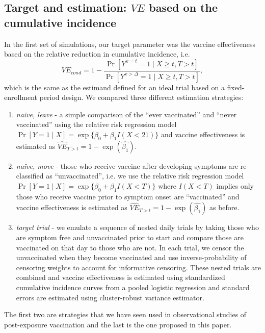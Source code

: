 \begin{appendices}
\begin{refsection}
    \subsection{Target and estimation: $VE$ based on the cumulative incidence}
    In the first set of simulations, our target parameter was the vaccine effectiveness based on the relative reduction in cumulative incidence, i.e.
    $$
    VE_{cond} = 1 - \frac{\Pr[Y^{x = t} = 1 \mid X \geq t, T > t]}{\Pr[Y^{x > \Delta} = 1 \mid X \geq t, T > t]},
    $$
    which is the same as the estimand defined for an ideal trial based on a fixed-enrollment period design. We compared three different estimation strategies:
    \begin{enumerate}
        \item \textit{na\"{i}ve, leave} - a simple comparison of the ``ever vaccinated'' and ``never vaccinated'' using the relative risk regression model $\Pr[Y = 1 \mid X] = \operatorname{exp}\{\beta_0 + \beta_1 I(X < 21)\}$ and vaccine effectiveness is estimated as $\widehat{VE}_{T > t} = 1 - \exp(\widehat{\beta_1})$.
        \item \textit{na\"{i}ve, move} - those who receive vaccine after developing symptoms are re-classified as ``unvaccinated'', i.e. we use the relative risk regression model $\Pr[Y = 1 \mid X] = \operatorname{exp}\{\beta_0 + \beta_1 I(X < T)\}$ where $I(X<T)$ implies only those who receive vaccine prior to symptom onset are ``vaccinated'' and vaccine effectiveness is estimated as $\widehat{VE}_{T > t} = 1 - \exp(\widehat{\beta_1})$ as before.
        \item \textit{target trial} - we emulate a sequence of nested daily trials by taking those who are symptom free and unvaccinated prior to start and compare those are vaccinated on that day to those who are not. In each trial, we censor the unvaccinated when they become vaccinated and use inverse-probability of censoring weights to account for informative censoring. These nested trials are combined and vaccine effectiveness is estimated using standardized cumulative incidence curves from a pooled logistic regression and standard errors are estimated using cluster-robust variance estimator.
    \end{enumerate}
    The first two are strategies that we have seen used in observational studies of post-exposure vaccination and the last is the one proposed in this paper.


\end{refsection}
\end{appendices}
